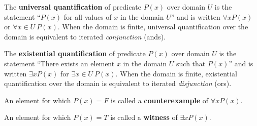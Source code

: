 
The {\bf universal quantification} of predicate $P(x)$ over
domain $U$ is the statement ``$P(x)$ for all values of $x$ in the domain $U$''
and is written $\forall x P(x)$ or $\forall x \in U ~P(x)$. 
When the domain is finite, universal quantification over the domain 
is equivalent to iterated {\it conjunction} (ands).

The {\bf existential quantification} of predicate $P(x)$ 
over domain $U$ is the statement ``There exists an element $x$ 
in the domain $U$ such that $P(x)$'' and is written $\exists x P(x)$
for $\exists x \in U ~P(x)$. 
When the domain is finite, existential quantification over the domain 
is equivalent to iterated {\it disjunction} (ors).

An element for which $P(x) = F$ is called a {\bf counterexample} of $\forall x P(x)$.

An element for which $P(x) = T$ is called a {\bf witness} of $\exists x P(x)$.
